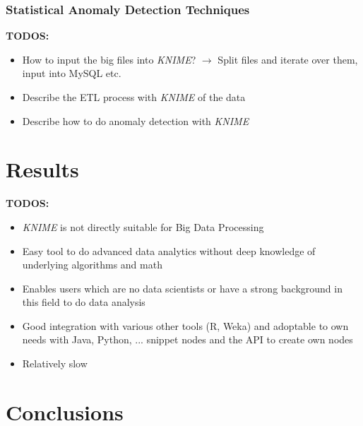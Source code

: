 \documentclass{dima}
\begin{document}
\subsubsection{Statistical Anomaly Detection Techniques}

\textbf{TODOS:}
\begin{itemize}
\item How to input the big files into \textit{KNIME}? $\rightarrow$ Split files and iterate over them, input into MySQL etc.
\item Describe the ETL process with \textit{KNIME} of the data
\item Describe how to do anomaly detection with \textit{KNIME}
\end{itemize}

\section{Results}
\textbf{TODOS:}
\begin{itemize}
\item \textit{KNIME} is not directly suitable for Big Data Processing
\item Easy tool to do advanced data analytics without deep knowledge of underlying algorithms and math
\item Enables users which are no data scientists or have a strong background in this field to do data analysis
\item Good integration with various other tools (R, Weka) and adoptable to own needs with Java, Python, ... snippet nodes and the API to create own nodes
\item Relatively slow
\end{itemize}


\section{Conclusions}



\end{document}
